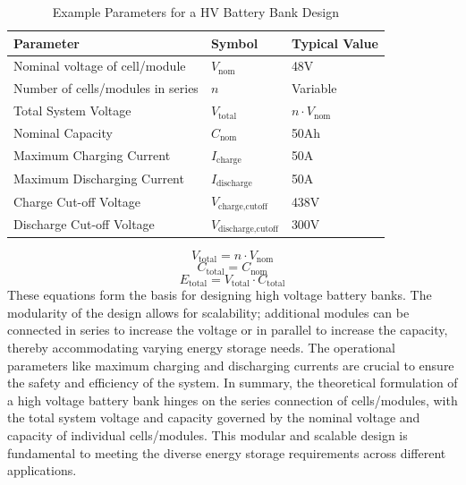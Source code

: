 \begin{table}[h]
\centering
\caption{Example Parameters for a HV Battery Bank Design\cite{source2}}
\label{tab:parameters}
\begin{tabular}{|p{7cm}|p{4cm}|p{4cm}|}
\hline
\textbf{Parameter} & \textbf{Symbol} & \textbf{Typical Value} \\ \hline
Nominal voltage of cell/module & \( V_{\text{nom}} \) & 48V \\ \hline
Number of cells/modules in series & \( n \) & Variable \\ \hline
Total System Voltage & \( V_{\text{total}} \) & \( n \cdot V_{\text{nom}} \) \\ \hline
Nominal Capacity & \( C_{\text{nom}} \) & 50Ah \\ \hline
Maximum Charging Current & \( I_{\text{charge}} \) & 50A \\ \hline
Maximum Discharging Current & \( I_{\text{discharge}} \) & 50A \\ \hline
Charge Cut-off Voltage & \( V_{\text{charge,cutoff}} \) & 438V \\ \hline
Discharge Cut-off Voltage & \( V_{\text{discharge,cutoff}} \) & 300V \\ \hline
\end{tabular}
\end{table}
\newpage
\begin{equation}
V_{\text{total}} = n \cdot V_{\text{nom}}
\label{eq:HV1}
\end{equation}
\begin{equation}
C_{\text{total}} = C_{\text{nom}}
\label{eq:HV2}
\end{equation}
\begin{equation}
E_{\text{total}} = V_{\text{total}} \cdot C_{\text{total}}
\label{eq:HV3}
\end{equation}\newline
\noindent
These equations form the basis for designing high voltage battery banks. The modularity of the design allows for scalability; additional modules can be connected in series to increase the voltage or in parallel to increase the capacity, thereby accommodating varying energy storage needs. The operational parameters like maximum charging and discharging currents are crucial to ensure the safety and efficiency of the system.\cite{source3}\newline\newline
\noindent
In summary, the theoretical formulation of a high voltage battery bank hinges on the series connection of cells/modules, with the total system voltage and capacity governed by the nominal voltage and capacity of individual cells/modules. This modular and scalable design is fundamental to meeting the diverse energy storage requirements across different applications.
